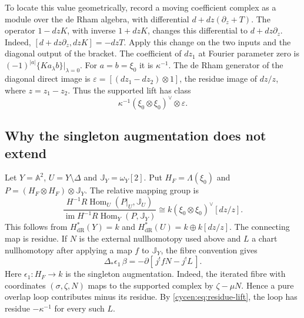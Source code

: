 To locate this value geometrically, record a moving
coefficient complex as a module over the de Rham algebra,
with differential $d+dz(\partial_z+T)$. The operator
$1-dzK$, with inverse $1+dzK$, changes this differential
to $d+dz\partial_z$. Indeed,
$[d+dz\partial_z,dzK]=-dzT$. Apply this change on the
two inputs and the diagonal output of the bracket.
The coefficient of $dz_1$ at Fourier parameter zero is
$(-1)^{|a|}\{Ka_\lambda b\}|_{\lambda=0}$.
For $a=b=\xi_0$ it is $\kappa^{-1}$.
The de Rham generator of the diagonal direct image is
$\varepsilon=[(dz_1-dz_2)\otimes1]$, the residue image
of $dz/z$, where $z=z_1-z_2$. Thus the supported lift has
class
\begin{equation}\label{cycen:eq:residue-lift}
 \kappa^{-1}(\xi_0\otimes\xi_0)^\vee\otimes\varepsilon.
\end{equation}

\subsection{Why the singleton augmentation does not extend}

Let $Y=\mathbb A^2$, $U=Y\setminus\Delta$ and
$\mathbb J_Y=\omega_Y[2]$. Put
$H_F=\Lambda(\xi_0)$ and
$P=(H_F\otimes H_F)\otimes\mathbb J_Y$.
The relative mapping group is
\begin{equation}\label{cycen:eq:relative-residue}
 \frac{H^{-1}R\operatorname{Hom}_U(P|_U,\mathbb J_U)}
 {\operatorname{im}H^{-1}R\operatorname{Hom}_Y(P,\mathbb J_Y)}
 \cong k(\xi_0\otimes\xi_0)^\vee[dz/z].
\end{equation}
This follows from $H^*_{\mathrm{dR}}(Y)=k$ and
$H^*_{\mathrm{dR}}(U)=k\oplus k[dz/z]$. The connecting
map is residue. If $N$ is the external nullhomotopy used
above and $L$ a chart nullhomotopy after applying a map
$f$ to $\mathbb J_Y$, the fibre convention gives
\[
 \Delta_*\epsilon_1\,\beta=-\partial[\,j^!fN-j^!L\,].
\]
Here $\epsilon_1:H_F\to k$ is the singleton augmentation.
Indeed, the iterated fibre with coordinates
$(\sigma,\zeta,N)$ maps to the supported complex by
$\zeta-\mu N$. Hence a pure overlap loop contributes
minus its residue. By \eqref{cycen:eq:residue-lift}, the
loop has residue $-\kappa^{-1}$ for every such $L$.

